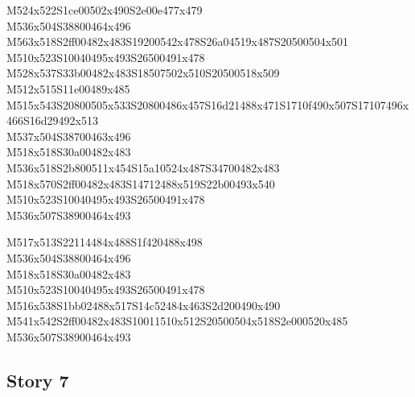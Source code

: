 \documentclass{article}
\begin{document}
\begin{multicols}{5}
\begin{center}
M524x522S1ce00502x490S2e00e477x479 %
\\M536x504S38800464x496 %
\\M563x518S2ff00482x483S19200542x478S26a04519x487S20500504x501 %
\\M510x523S10040495x493S26500491x478 %
\\M528x537S33b00482x483S18507502x510S20500518x509 %
\\M512x515S11e00489x485 %
\\M515x543S20800505x533S20800486x457S16d21488x471S1710f490x507S17107496x466S16d29492x513 %
\\M537x504S38700463x496 %
\\M518x518S30a00482x483 %
\\M536x518S2b800511x454S15a10524x487S34700482x483 %
\\M518x570S2ff00482x483S14712488x519S22b00493x540 %
\\M510x523S10040495x493S26500491x478 %
\\M536x507S38900464x493 %
\vfil
\columnbreak

M517x513S22114484x488S1f420488x498 %
\\M536x504S38800464x496 %
\\M518x518S30a00482x483 %
\\M510x523S10040495x493S26500491x478 %
\\M516x538S1bb02488x517S14c52484x463S2d200490x490 %
\\M541x542S2ff00482x483S10011510x512S20500504x518S2e000520x485 %
\\M536x507S38900464x493 %
\vfil

\end{center}
\end{multicols}

\subsection{Story 7}
\end{document}
